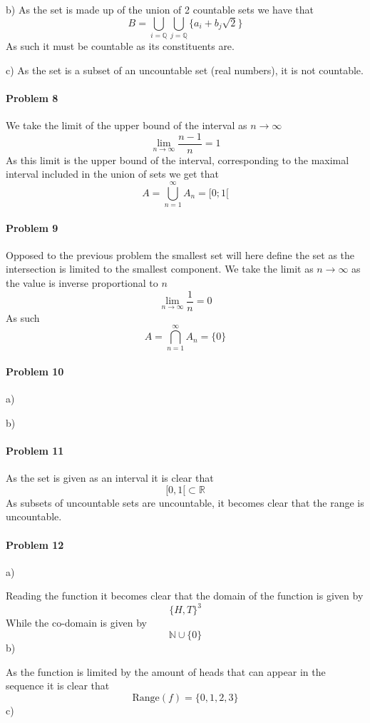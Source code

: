 b) As the set is made up of the union of 2 countable sets we have that
\[
    B=\bigcup_{i=\mathbb{Q}}\bigcup_{j=\mathbb{Q}}\{a_i+b_j\sqrt{2}\}
\]
As such it must be countable as its constituents are.

c) As the set is a subset of an uncountable set (real numbers), it is not countable.

\paragraph{Problem 8}
We take the limit of the upper bound of the interval as $n\rightarrow\infty$
\[
    \lim_{n\rightarrow\infty}\frac{n-1}{n}=1
\]
As this limit is the upper bound of the interval, corresponding to the maximal interval included in the union of sets we get that
\[
    A=\bigcup_{n=1}^{\infty}A_n=[0;1[
\]
\paragraph{Problem 9}
Opposed to the previous problem the smallest set will here define the set as the intersection is limited to the smallest component. We take the limit as $n\rightarrow \infty$ as the value is inverse proportional to $n$
\[
    \lim_{n\rightarrow\infty}\frac{1}{n}=0
\]
As such
\[
    A=\bigcap_{n=1}^{\infty}A_n=\{0\}
\]
\paragraph{Problem 10}
a)


b)


\paragraph{Problem 11}
As the set is given as an interval it is clear that
\[
    [0,1[\subset\mathbb{R}
\]
As subsets of uncountable sets are uncountable, it becomes clear that the range is uncountable.
\paragraph{Problem 12}
a)

Reading the function it becomes clear that the domain of the function is given by
\[
    \{H,T\}^{3}
\]
While the co-domain is given by
\[
    \mathbb{N}\cup \{0\}
\]
b)

As the function is limited by the amount of heads that can appear in the sequence it is clear that
\[
    \text{Range}(f)=\{0,1,2,3\}
\]
c)

